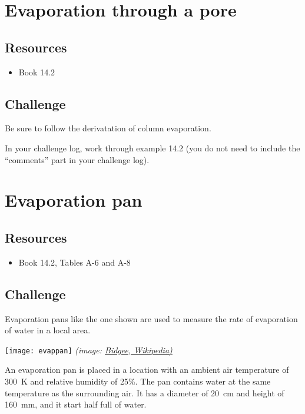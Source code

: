 \newpage
\section{Evaporation through a pore}

\subsection*{Resources}
\begin{itemize}
    \item Book 14.2
\end{itemize}

\subsection*{Challenge}
Be sure to follow the derivatation of column evaporation.

In your challenge log, work through example 14.2 (you do not need to include the ``comments'' part in your challenge log).




\newpage
\section{Evaporation pan}

\subsection*{Resources}
\begin{itemize}
    \item Book 14.2, Tables A-6 and A-8
\end{itemize}

\subsection*{Challenge}
Evaporation pans like the one shown are used to measure the rate of evaporation of water in a local area.

\texttt{[image: evappan]}
\emph{(image: \href{https://commons.wikimedia.org/wiki/File:Evaporation_Pan.jpg}{Bidgee, Wikipedia)}}

An evaporation pan is placed in a location with an ambient air temperature of \SI{300}{\kelvin} and relative humidity of 25\%. The pan contains water at the same temperature as the surrounding air. It has a diameter of \SI{20}{\cm} and height of \SI{160}{\mm}, and it start half full of water.

